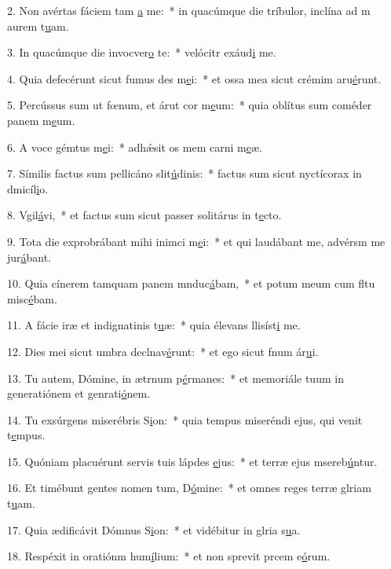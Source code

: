2. Non avértas fáciem tam \uline{a} me:~* in quacúmque die tríbulor, inclína ad m aurem t\uline{u}am.\par 
3. In quacúmque die invocver\uline{o} te:~* velócitr exáud\uline{i} me.\par 
4. Quia defecérunt sicut fumus des m\uline{e}i:~* et ossa mea sicut crémim aru\uline{é}runt.\par 
5. Percússus sum ut fœnum, et árut cor m\uline{e}um:~* quia oblítus sum coméder panem m\uline{e}um.\par 
6. A voce gémtus m\uline{e}i:~* adhǽsit os mem carni m\uline{e}æ.\par 
7. Símilis factus sum pellicáno slit\uline{ú}dinis:~* factus sum sicut nyctícorax in dmicíl\uline{i}o.\par 
8. Vgil\uline{á}vi,~* et factus sum sicut passer solitárus in t\uline{e}cto.\par 
9. Tota die exprobrábant mihi inimci m\uline{e}i:~* et qui laudábant me, advérsm me jur\uline{á}bant.\par 
10. Quia cínerem tamquam panem mnduc\uline{á}bam,~* et potum meum cum fltu misc\uline{é}bam.\par 
11. A fácie iræ et indignatinis t\uline{u}æ:~* quia élevans llisíst\uline{i} me.\par 
12. Dies mei sicut umbra declnav\uline{é}runt:~* et ego sicut fnum ár\uline{u}i.\par 
13. Tu autem, Dómine, in ætrnum p\uline{é}rmanes:~* et memoriále tuum in generatiónem et genrati\uline{ó}nem.\par 
14. Tu exsúrgens miserébris S\uline{i}on:~* quia tempus miseréndi ejus, qui venit t\uline{e}mpus.\par 
15. Quóniam placuérunt servis tuis lápdes \uline{e}jus:~* et terræ ejus msereb\uline{ú}ntur.\par 
16. Et timébunt gentes nomen tum, D\uline{ó}mine:~* et omnes reges terræ glriam t\uline{u}am.\par 
17. Quia ædificávit Dómnus S\uline{i}on:~* et vidébitur in glria s\uline{u}a.\par 
18. Respéxit in oratiónm hum\uline{í}lium:~* et non sprevit prcem e\uline{ó}rum.\par 
